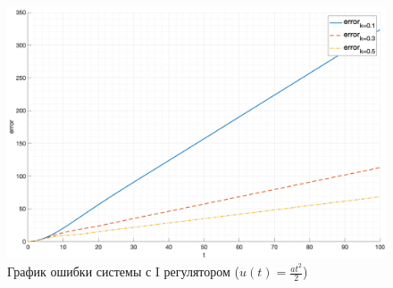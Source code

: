 \begin{figure}[ht!]
    \centering
    \includegraphics[width=\textwidth]{"media/plots/task4_error3.png"}
    \caption{График ошибки системы с I регулятором ($u(t) = \frac{at^2}{2}$)}
    \label{fig:task4_error3}
\end{figure}






